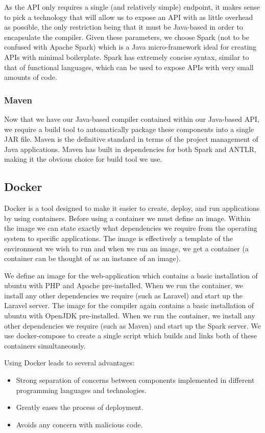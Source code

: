 \documentclass{l4proj}
\begin{document}
As the API only requires a single (and relatively simple) endpoint, it makes sense to pick a technology that will allow us to expose an API with as little overhead as possible, the only restriction being that it must be Java-based in order to encapsulate the compiler. Given these parameters, we choose Spark (not to be confused with Apache Spark) which is a Java micro-framework ideal for creating APIs with minimal boilerplate. Spark has extremely concise syntax, similar to that of functional languages, which can be used to expose APIs with very small amounts of code.
\subsubsection{Maven}
Now that we have our Java-based compiler contained within our Java-based API, we require a build tool to automatically package these components into a single JAR file. Maven is the definitive standard in terms of the project management of Java applications. Maven has built in dependencies for both Spark and ANTLR, making it the obvious choice for build tool we use.
\subsection{Docker}
Docker is a tool designed to make it easier to create, deploy, and run applications by using containers. Before using a container we must define an image. Within the image we can state exactly what dependencies we require from the operating system to specific applications. The image is effectively a template of the environment we wish to run and when we run an image, we get a container (a container can be thought of as an instance of an image). 

We define an image for the web-application which contains a basic installation of ubuntu with PHP and Apache pre-installed. When we run the container, we install any other dependencies we require (such as Laravel) and start up the Laravel server. The image for the compiler again contains a basic installation of ubuntu with OpenJDK pre-installed. When we run the container, we install any other dependencies we require (such as Maven) and start up the Spark server. We use docker-compose to create a single script which builds and links both of these containers simultaneously.

Using Docker leads to several advantages:
\begin{itemize}
\item Strong separation of concerns between components implemented in different programming languages and technologies.
\item Greatly eases the process of deployment.
\item Avoids any concern with malicious code.
\end{itemize}
\end{document}
